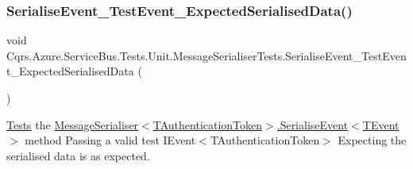 \subsubsection{\texorpdfstring{Serialise\+Event\+\_\+\+Test\+Event\+\_\+\+Expected\+Serialised\+Data()}{SerialiseEvent\_TestEvent\_ExpectedSerialisedData()}}
{\footnotesize\ttfamily void Cqrs.\+Azure.\+Service\+Bus.\+Tests.\+Unit.\+Message\+Serialiser\+Tests.\+Serialise\+Event\+\_\+\+Test\+Event\+\_\+\+Expected\+Serialised\+Data (\begin{DoxyParamCaption}{ }\end{DoxyParamCaption})}



\hyperlink{namespaceCqrs_1_1Azure_1_1ServiceBus_1_1Tests}{Tests} the \hyperlink{classCqrs_1_1Azure_1_1ServiceBus_1_1MessageSerialiser_a5650683271dec423489b016da15d8d3d_a5650683271dec423489b016da15d8d3d}{Message\+Serialiser$<$\+T\+Authentication\+Token$>$.\+Serialise\+Event$<$\+T\+Event$>$} method Passing a valid test I\+Event$<$\+T\+Authentication\+Token$>$ Expecting the serialised data is as expected. 

